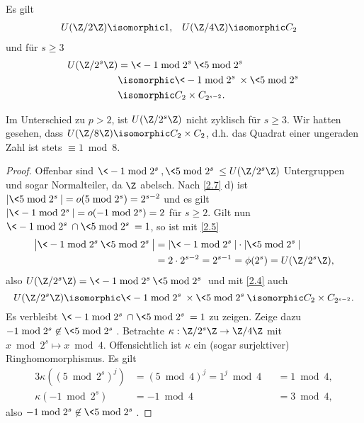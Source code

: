 \begin{st} \label{2.10}
	Es gilt
	\begin{align*}
		U(\Z / 2 \Z) &\isomorphic 1, &
		U(\Z / 4 \Z) &\isomorphic C_2
	\end{align*}
	und für $s \ge 3$
	\begin{align*}
		U(\Z / 2^s \Z)
		&= \< -1 \bmod 2^s \> \< 5 \bmod 2^s \> \\
		&\isomorphic \< - 1 \bmod 2^s \> \times \< 5 \bmod 2^s \> \\
		&\isomorphic C_2 \times C_{2^{s-2}}.
	\end{align*}
	\begin{note}
		Im Unterschied zu $p > 2$, ist $U(\Z / 2^s \Z)$ nicht zyklisch für $s \ge 3$.
		Wir hatten gesehen, dass $U(\Z / 8 \Z) \isomorphic C_2 \times C_2$, d.h. das Quadrat einer ungeraden Zahl ist stets $\equiv 1 \bmod 8$.
	\end{note}
	\begin{proof}
		Offenbar sind $\< -1 \bmod 2^s\>, \<5 \bmod 2^s\> \le U(\Z / 2^s \Z)$ Untergruppen und sogar Normalteiler, da $\Z$ abelsch.
		Nach \ref{2.7} d) ist $|\<5 \bmod 2^s\>| = o(5 \bmod 2^s) = 2^{s-2}$ und es gilt $|\< -1 \bmod 2^s\>| = o(-1 \bmod 2^s) = 2$ für $s \ge 2$.
		Gilt nun $\<-1 \bmod 2^s\> \cap \<5 \bmod 2^s\> = 1$, so ist mit \ref{2.5}
		\begin{align*}
			\big|\<-1 \bmod 2^s\> \<5 \bmod 2^s\> \big|
			&= |\<-1 \bmod 2^s\>| \cdot |\<5 \bmod 2^s\>| \\
			&= 2 \cdot 2^{s-2}
			= 2^{s-1}
			= \phi(2^s)
			= U(\Z / 2^s \Z),
		\end{align*}
		also $U(\Z / 2^s \Z) = \<-1 \bmod 2^s\> \<5 \bmod 2^s\>$ und mit \ref{2.4} auch
		\[
			U(\Z / 2^s \Z) \isomorphic \<-1 \bmod 2^s\> \times \<5 \bmod 2^s\>
			\isomorphic C_2 \times C_{2^{s-2}}.
		\]
		Es verbleibt $\<-1 \bmod 2^s\> \cap \<5 \bmod 2^s\> = 1$ zu zeigen.
		Zeige dazu $-1 \bmod 2^s \not\in \< 5 \bmod 2^s \>$.
		Betrachte $\kappa: \Z / 2^s \Z \to \Z / 4 \Z$ mit $x \bmod 2^s \mapsto x \bmod 4$.
		Offensichtlich ist $\kappa$ ein (sogar surjektiver) Ringhomomorphismus.
		Es gilt
		\begin{alignat*}{3}
			\kappa((5 \bmod 2^s)^j) &= (5 \bmod 4)^j = 1^j \bmod 4 &&= 1 \bmod 4, \\
			\kappa(-1 \bmod 2^s) &= -1 \bmod 4 &&= 3 \bmod 4,
		\end{alignat*}
		also $-1 \bmod 2^s \not\in \< 5 \bmod 2^s\>$.
	\end{proof}
\end{st}


